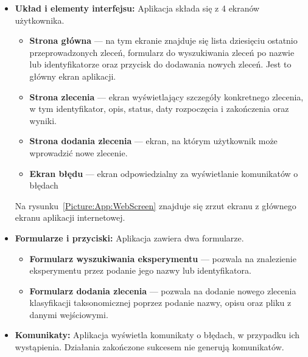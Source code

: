                 \begin{itemize}
                    \item {
                        \textbf{Układ i elementy interfejsu:}
                        Aplikacja składa się z 4 ekranów użytkownika.
                        \begin{itemize}
                            \item {
                                \textbf{Strona główna} — na tym ekranie znajduje się lista dziesięciu ostatnio przeprowadzonych zleceń, formularz do wyszukiwania zleceń po nazwie lub identyfikatorze oraz przycisk do dodawania nowych zleceń. Jest to główny ekran aplikacji.
                            }
                            \item {
                                \textbf{Strona zlecenia} — ekran wyświetlający szczegóły konkretnego zlecenia, w tym identyfikator, opis, status, daty rozpoczęcia i zakończenia oraz wyniki.
                            }
                            \item {
                                \textbf{Strona dodania zlecenia} — ekran, na którym użytkownik może wprowadzić nowe zlecenie.
                            }
                            \item {
                                \textbf{Ekran błędu} — ekran odpowiedzialny za wyświetlanie komunikatów o błędach
                            }
                        \end{itemize}
                        Na rysunku~\ref{Picture:App:WebScreen} znajduje się zrzut ekranu z głównego ekranu aplikacji internetowej.
                    }
                    \item {
                        \textbf{Formularze i przyciski:}
                        Aplikacja zawiera dwa formularze.
                        \begin{itemize}
                            \item {
                                \textbf{Formularz wyszukiwania eksperymentu} — pozwala na znalezienie eksperymentu przez podanie jego nazwy lub identyfikatora.
                            }
                            \item {
                                \textbf{Formularz dodania zlecenia} — pozwala na dodanie nowego zlecenia klasyfikacji taksonomicznej poprzez podanie nazwy, opisu oraz pliku z danymi wejściowymi.
                            }
                        \end{itemize}
                    }
                    \item {
                        \textbf{Komunikaty:}
                        Aplikacja wyświetla komunikaty o błędach, w przypadku ich wystąpienia. Działania zakończone sukcesem nie generują komunikatów.
                    }
                \end{itemize}

